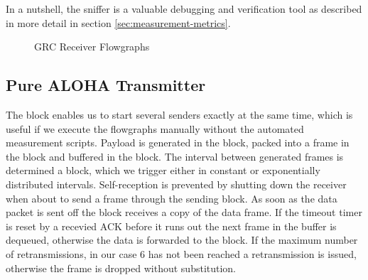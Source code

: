 In a nutshell, the sniffer is a valuable debugging and verification tool as described in more detail in section \ref{sec:measurement-metrics}.

\begin{figure}
	\label{fig:grc-receiver}
	\begin{center}
		\vskip 40pt
	\end{center}
	\caption{GRC Receiver Flowgraphs}
\end{figure}

\subsection{Pure ALOHA Transmitter}
The  block enables us to start several senders exactly at the same time, which is useful if we execute the flowgraphs manually without the automated measurement scripts. Payload is generated in the  block, packed into a frame in the  block and buffered in the  block. The interval between generated frames is determined a  block, which we trigger either in constant or exponentially distributed intervals. Self-reception is prevented by shutting down the receiver when about to send a frame through the sending block. As soon as the data packet is sent off the  block receives a copy of the data frame. If the timeout timer is reset by a recevied ACK before it runs out the next frame in the buffer is dequeued, otherwise the data is forwarded to the  block. If the maximum number of retransmissions, in our case 6 has not been reached a retransmission is issued, otherwise the frame is dropped without substitution.

